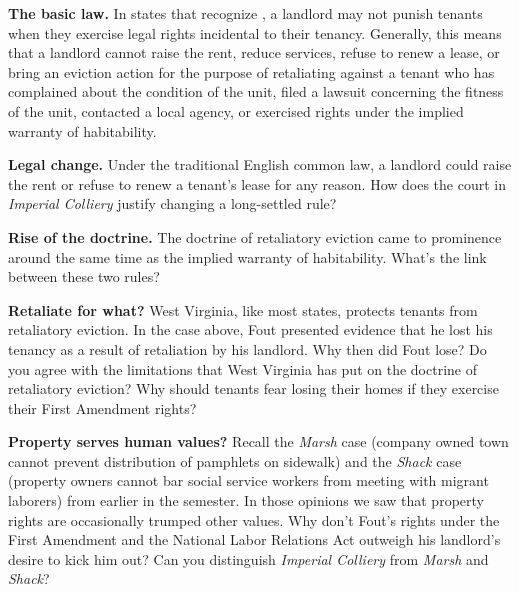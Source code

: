 
\item \textbf{The basic law.} In states that recognize , a
landlord may not punish tenants when they exercise legal rights incidental to
their tenancy.  Generally, this means that a landlord cannot raise the rent,
reduce services, refuse to renew a lease, or bring an eviction action for the
purpose of retaliating against a tenant who has complained about the condition
of the unit, filed a lawsuit concerning the fitness of the unit, contacted a
local agency, or exercised rights under the implied warranty of habitability.  


\item \textbf{Legal change.} Under the traditional English common law, a
landlord could raise the rent or refuse to renew a tenant's lease for any
reason.  How does the court in \textit{Imperial Colliery} justify changing a
long-settled rule?


\item \textbf{Rise of the doctrine.} The doctrine of retaliatory eviction came
to prominence around the same time as the implied warranty of habitability. 
What's the link between these two rules?  


\item \textbf{Retaliate for what?} West Virginia, like most states, protects
tenants from retaliatory eviction. In the case above, Fout presented evidence
that he lost his tenancy as a result of retaliation by his landlord.  Why then
did Fout lose?  Do you agree with the limitations that West Virginia has put on
the doctrine of retaliatory eviction?  Why should tenants fear losing their
homes if they exercise their First Amendment rights?


\item \textbf{Property serves human values?} Recall the \textit{Marsh} case
(company owned town cannot prevent distribution of pamphlets on sidewalk) and
the \textit{Shack} case (property owners cannot bar social service workers from
meeting with migrant laborers) from earlier in the semester.  In those opinions
we saw that property rights are occasionally trumped other values.  Why don't
Fout's rights under the First Amendment and the National Labor Relations Act
outweigh his landlord's desire to kick him out?  Can you distinguish
\textit{Imperial Colliery} from \textit{Marsh} and \textit{Shack}?  


